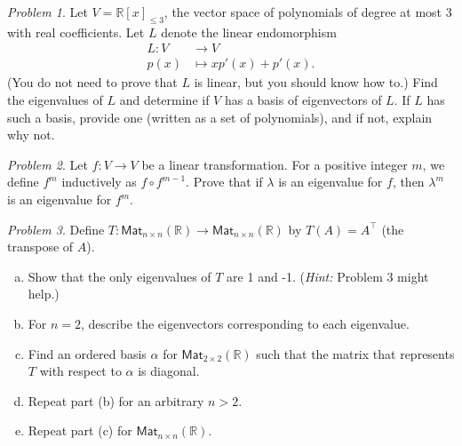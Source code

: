 \documentclass[11pt,twoside]{amsart}
\theoremstyle{plain}
\theoremstyle{remark}
\newtheorem{prob}{Problem}
\theoremstyle{definition}
\theoremstyle{definition}
\newcommand{\RR}{\mathbb{R}}
\newcommand{\R}{\mathbb{R}}
\newcommand{\Mat}{\mathsf{Mat}}
\begin{document}

\begin{prob}
Let $V = \RR[x]_{\le 3}$, the vector space of polynomials of degree at most $3$ with real coefficients.  Let $L$ denote the linear endomorphism
\[
\begin{aligned}
  L\colon V&\longrightarrow V\\
  p(x)&\longmapsto xp'(x)+p'(x).
\end{aligned}
\]
(You do not need to prove that $L$ is linear, but you should know how to.)  Find the eigenvalues of $L$ and determine if $V$ has a basis of eigenvectors of $L$.  If $L$ has such a basis, provide one (written as a set of polynomials), and if not, explain why not.
\end{prob}

\begin{prob}
Let $f\colon V \to V$ be a linear transformation. For a positive integer $m$, we define $f^m$ inductively as $f\circ f^{m-1}$. Prove that if $\lambda$ is an eigenvalue for $f$, then $\lambda^m$ is an eigenvalue for $f^m$.
\end{prob}

\begin{prob}
Define $T\colon \Mat_{n\times n}(\R) \to \Mat_{n\times n}(\R)$ by $T(A)=A^\top$ (the transpose of $A$).
   \begin{enumerate}[(a)]
    \item Show that the only eigenvalues of $T$ are 1 and -1. (\emph{Hint:} Problem 3 might help.)
    \item For $n=2$, describe the eigenvectors corresponding to each eigenvalue. 
    \item Find an ordered basis $\alpha$ for $\Mat_{2\times 2}(\R)$ such that the matrix that represents $T$ with respect to $\alpha$ is diagonal.
    \item Repeat part (b) for an arbitrary $n>2$.
    \item Repeat part (c) for $\Mat_{n\times n}(\R)$.
   \end{enumerate}
\end{prob}
\end{document}
